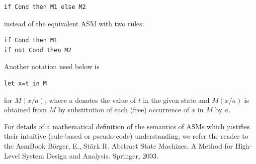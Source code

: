

\begin{lstlisting}
if Cond then M1 else M2
\end{lstlisting}

instead of the equivalent ASM with two rules:

\begin{lstlisting}
if Cond then M1
if not Cond then M2
\end{lstlisting}

Another notation used below is

\begin{lstlisting}
let x=t in M
\end{lstlisting}

for $M(x/a)$, where $a$ denotes the value of $t$ in the given state and $M(x/a)$ is obtained from $M$ by substitution of each (free) occurrence of $x$ in $M$ by $a$.

For details of a mathematical definition of the semantics of ASMs which justifies their intuitive (rule-based or pseudo-code) understanding, we refer the reader to the AsmBook Börger, E., Stärk R. Abstract State Machines. A Method for High-Level System Design and Analysis. Springer, 2003.





